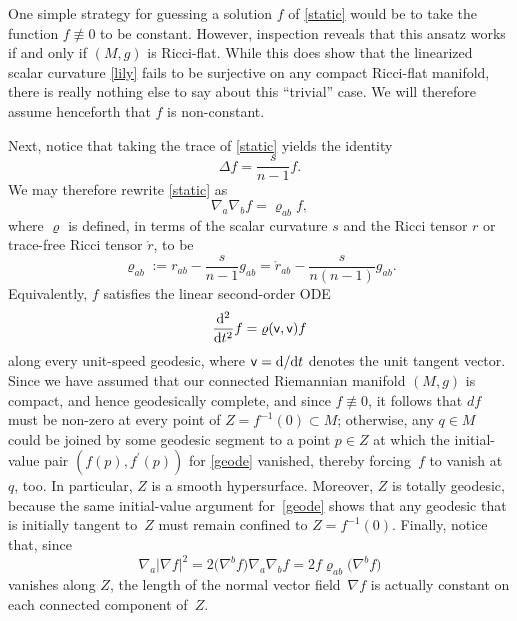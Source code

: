 \documentclass[pdftex]{sigma}
\numberwithin{equation}{section}
\begin{document}
One simple strategy for guessing a solution $f$ of \eqref{static} would be to take the function $f\not\equiv 0$ to be constant.
However, inspection reveals that this ansatz works
 if and only if $(M,g)$ is Ricci-flat. While this does show that the linearized scalar curvature \eqref{lily} fails to be surjective on any compact Ricci-flat manifold,
 there is really nothing else to say about this ``trivial'' case. {We will therefore assume henceforth that $f$ is non-constant}.

Next, notice that taking the trace of \eqref{static} yields the identity
\begin{equation}
\label{basso}
\Delta f = \frac{s}{n-1} f .
\end{equation}
We may therefore rewrite \eqref{static}
as
\begin{equation}
\label{thingone}
\nabla_a \nabla_b f = \varrho_{ab} f,
\end{equation}
where $\varrho$ is defined, in terms of the scalar curvature $s$ and the Ricci tensor $r$ or trace-free Ricci tensor $\mathring{r}$, to be
\begin{equation*}
\varrho_{ab}:= r_{ab} - \frac{s}{n-1} g_{ab}= \mathring{r}_{ab} - \frac{s}{n(n-1)} g_{ab}.
\end{equation*}
Equivalently, $f$ satisfies the linear second-order ODE
\begin{equation}\label{geode}
\frac{{\rm d}^2}{{\rm d}t^2}f = \varrho (\mathsf{v} , \mathsf{v})f
\end{equation}
along every unit-speed geodesic, where $\mathsf{v}={\rm d}/{\rm d}t$ denotes the unit tangent vector.
Since we have assumed that our connected Riemannian manifold $(M,g)$ is compact, and hence
geodesically complete, and since
$f\not\equiv 0$, it follows that $df$ must be non-zero at every point of $Z=f^{-1}(0)\subset M$;
otherwise, any $q\in M$ could be joined by some geodesic segment to a point $p\in Z$
at which the initial-value pair $(f(p), f^\prime (p))$ for \eqref{geode} vanished, thereby forcing~$f$ to vanish at~$q$, too.
In particular, $Z$ is a smooth hypersurface. Moreover, $Z$ is totally geodesic, because the same initial-value argument for~\eqref{geode} shows that any geodesic that is initially tangent to~$Z$
 must remain confined to $Z=f^{-1}(0)$.
Finally, notice that, since
 \begin{equation*}
\nabla_a |\nabla f|^2 = {2}\big(\nabla^b f\big) \nabla_a \nabla_b f= 2f\varrho_{ab}\big(\nabla^b f\big)
\end{equation*}
vanishes along $Z$, the length of the normal vector field~$\nabla f$ is actually constant on each connected component of~$Z$.
\end{document}
